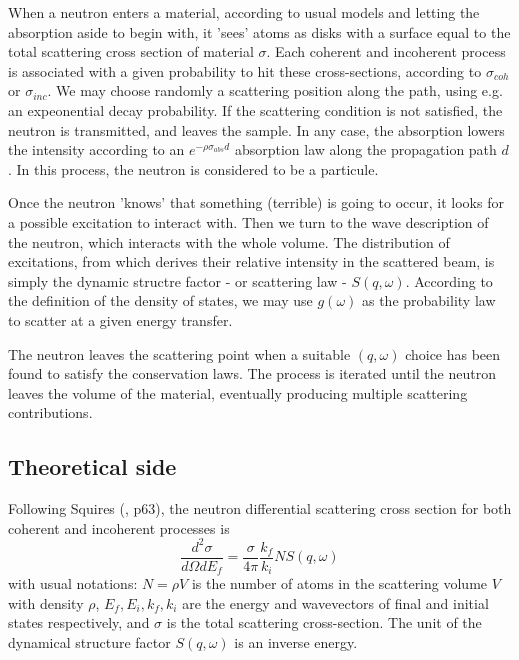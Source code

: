 When a neutron enters a material, according to usual models and letting the absorption aside to begin with, it 'sees' atoms as disks with a surface equal to the total scattering cross section of material $\sigma$. Each coherent and incoherent process is associated with a given probability to hit these cross-sections, according to $\sigma_{coh}$ or $\sigma_{inc}$. We may choose randomly a scattering position along the path, using e.g. an expeonential decay probability. If the scattering condition is not satisfied, the neutron is transmitted, and leaves the sample. In any case, the absorption lowers the intensity according to an $e^{-\rho \sigma_{abs}d}$ absorption law along the propagation path $d$. In this process, the neutron is considered to be a particule.

Once the neutron 'knows' that something (terrible) is going to occur, it looks for a possible excitation to interact with. Then we turn to the wave description of the neutron, which interacts with the whole volume. The distribution of excitations, from which derives their relative intensity in the scattered beam, is simply the dynamic structre factor - or scattering law - $S(q,\omega)$. According to the definition of the density of states, we may use $g(\omega)$ as the probability law to scatter at a given energy transfer.

The neutron leaves the scattering point when a suitable $(q, \omega)$ choice has been found to satisfy the conservation laws. The process is iterated until the neutron leaves the volume of the material, eventually producing multiple scattering contributions.

\subsection{Theoretical side}

Following Squires (\cite{squires}, p63), the neutron differential scattering cross section for both coherent and incoherent processes is
\begin{equation}
\frac{d^2\sigma}{d\Omega dE_f} = \frac{\sigma}{4\pi}\frac{k_f}{k_i} N S(q, \omega)
\end{equation}
with usual notations: $N=\rho V$ is the number of atoms in the scattering volume $V$ with density $\rho$, $E_f, E_i, k_f, k_i$ are the energy and wavevectors of final and initial states respectively, and $\sigma$ is the total scattering cross-section. The unit of the dynamical structure factor $S(q,\omega)$ is an inverse energy.

